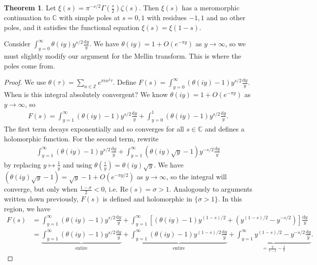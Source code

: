 \documentclass{article}
\theoremstyle{definition}
\newtheorem{theorem}{Theorem}[section]
\begin{document}
\begin{theorem}
    Let $\xi(s) = \pi^{-s/2}\Gamma \left(\frac{s}{2}\right)\zeta(s)$. Then $\xi(s)$ has a meromorphic continuation to $\mathbb{C}$ with simple poles at $s=0,1$ with residues $-1,1$ and no other poles, and it satisfies the functional equation $\xi(s) = \xi(1-s)$.
\end{theorem}
Consider $\int_{y=0}^{\infty} \theta(iy)y^{s/2}\frac{\mathrm{d}y}{y}$. We have $\theta(iy) = 1 + O (e^{-\pi y})$ as $y \to \infty$, so we must slightly modify our argument for the Mellin transform. This is where the poles come from.
\begin{proof}
    We use $\theta(\tau) = \sum_{n \in \mathbb{Z}}^{} e^{\pi i n^2 \tau}$. Define $F(s) = \int_{y=0}^{\infty} (\theta(iy)-1) y^{s/2} \frac{\mathrm{d}y}{y}$. When is this integral absolutely convergent? We know $\theta(iy) = 1 + O (e^{-\pi y})$ as $y \to \infty$, so \begin{align*}
        F(s) = \int_{y=1}^{\infty}  (\theta(iy)-1) y^{s/2} \frac{\mathrm{d}y}{y} + \int_{y=0}^{1}  (\theta(iy)-1) y^{s/2} \frac{\mathrm{d}y}{y}.
    \end{align*}
    The first term decays exponentially and so converges for all $s \in \mathbb{C}$ and defines a holomorphic function. For the second term, rewrite
    \begin{align*}
        \int_{y=1}^{\infty}  (\theta(iy)-1) y^{s/2} \frac{\mathrm{d}y}{y} + \int_{y=1}^{\infty} (\theta(iy)\sqrt{y}-1) y^{-s/2} \frac{\mathrm{d}y}{y}
    \end{align*}
    by replacing $y \mapsto \frac{1}{y}$ and using $\theta \left(\frac{i}{y}\right) = \theta(iy)\sqrt{y}$. We have $(\theta(iy)\sqrt{y}-1) = \sqrt{y} - 1 + O(e^{-\pi y/2})$ as $y \to \infty$, so the integral will converge, but only when $\frac{1-\sigma}{2}<0$, i.e. $\text{Re}(s) = \sigma>1$. Analogously to arguments written down previously, $F(s)$ is defined and holomorphic in $\{\sigma > 1\}$. In this region, we have 
    \begin{align*}
        F(s) &= \int_{y=1}^{\infty}  (\theta(iy)-1) y^{s/2} \frac{\mathrm{d}y}{y} + \int_{y=1}^{\infty} \left[(\theta(iy)-1)y^{(1-s)/2} + (y^{(1-s)/2}-y^{-s/2})\right]\frac{\mathrm{d}y}{y} \\
        &= \underbrace{\int_{y=1}^{\infty}  (\theta(iy)-1) y^{s/2} \frac{\mathrm{d}y}{y}}_{\text{entire}} + \underbrace{\int_{y=1}^{\infty} (\theta(iy)-1)y^{(1-s)/2}\frac{\mathrm{d}y}{y}}_{\text{entire}} + \underbrace{\int_{y=1}^{\infty} y^{(1-s)/2}-y^{-s/2}\frac{\mathrm{d}y}{y}}_{=\frac{2}{s-1}-\frac{2}{s}}.

\end{align*}
\end{proof}
\end{document}
